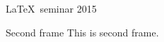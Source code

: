 \documentclass{beamer}
\begin{document}
	
	\begin{frame}
		\LaTeX ~seminar 2015
	\end{frame}
	
	\begin{frame}{Second frame}
		This is second frame.
	\end{frame}
	
\end{document}

